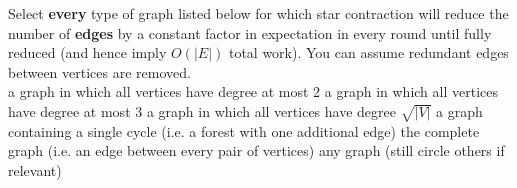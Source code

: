 \begin{problem}
Select \textbf{every} type of graph listed below for which star
contraction will reduce the number of \textbf{edges} by a constant
factor in expectation in every round until fully reduced (and hence
imply $O(|E|)$ total work).  You can assume redundant edges between
vertices are removed.\\

\anychoice
\choice*  a graph in which all vertices have degree at most 2
\choice a graph in which all vertices have degree at most 3
\choice a graph in which all vertices have degree $\sqrt{|V|}$
\choice* a graph containing a single cycle (i.e. a forest with one additional edge)
\choice* the complete graph (i.e. an edge between every pair of vertices)
\choice any graph (still circle others if relevant)

\end{problem}
